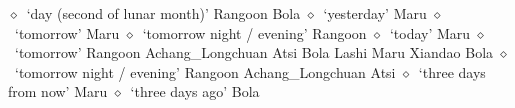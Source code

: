          $\diamond$~`day (second of lunar month)'
         Rangoon 
\hspace{1ex}
         Bola 
\hspace{1ex}
         $\diamond$~`yesterday'
         Maru 
\hspace{1ex}
         $\diamond$~`tomorrow'
         Maru 
\hspace{1ex}
         $\diamond$~`tomorrow night / evening'
         Rangoon 
\hspace{1ex}
         $\diamond$~`today'
         Maru 
\hspace{1ex}
         $\diamond$~`tomorrow'
         Rangoon 
\hspace{1ex}
         Achang\_Longchuan 
\hspace{1ex}
         Atsi 
\hspace{1ex}
         Bola 
\hspace{1ex}
         Lashi 
\hspace{1ex}
         Maru 
\hspace{1ex}
         Xiandao 
\hspace{1ex}
         Bola 
\hspace{1ex}
         $\diamond$~`tomorrow night / evening'
         Rangoon 
\hspace{1ex}
         Achang\_Longchuan 
\hspace{1ex}
         Atsi 
\hspace{1ex}
         $\diamond$~`three days from now'
         Maru 
\hspace{1ex}
         $\diamond$~`three days ago'
         Bola 
